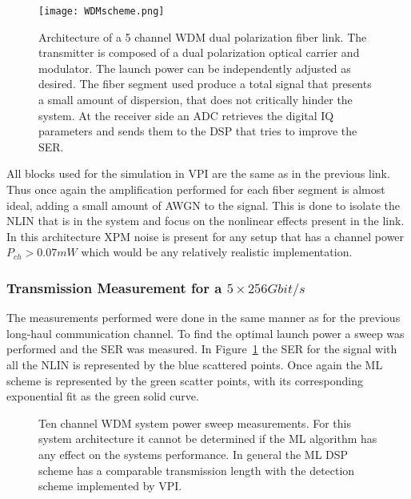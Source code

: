     
\begin{figure}[H]
\centering
\texttt{[image: WDMscheme.png]}
\caption{Architecture of a 5 channel WDM dual polarization fiber link. The transmitter is composed of a dual polarization optical carrier  and modulator. The launch power can be independently adjusted as desired. The fiber segment used produce a total signal that presents a small amount of dispersion, that does not critically hinder the system. At the receiver side an ADC retrieves the digital IQ parameters and sends them to the DSP that tries to improve the SER. }
\end{figure}

All blocks used for the simulation in VPI are the same as in the previous link. Thus once again the amplification performed for each fiber segment is almost ideal, adding a small amount of AWGN to the signal. This is done to isolate the NLIN that is in the system and focus on the nonlinear effects present in the link. In this architecture XPM noise is present for any setup that has a channel power $P_{ch}>0.07mW$ which would be any relatively realistic implementation. 


\subsubsection{Transmission Measurement for a $5\times 256 Gbit/s $}
 The measurements performed were done in the same manner as for the previous long-haul communication channel. To find the optimal launch power a sweep was performed and the SER was measured. In Figure~\ref{fig:powWDM} the SER for the signal with all the NLIN is represented by the blue scattered points. Once again the ML scheme is represented by the green scatter points, with its corresponding exponential fit as the green solid curve. 
 
\begin{figure}[h]
\centering
{}
\qquad
{}
\qquad
{}
\qquad
{}
\caption{Ten channel WDM system power sweep measurements. For this system architecture it cannot be determined if the ML algorithm has any effect on the systems performance. In general the ML DSP scheme has a comparable transmission length with the detection scheme implemented by VPI.  }
\label{fig:powWDM}
\end{figure}

